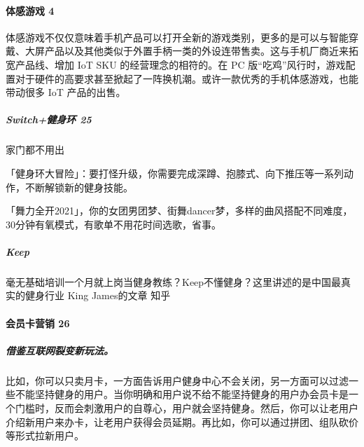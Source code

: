 \documentclass[letterpaper,11pt,english]{sphinxmanual}
\begin{document}
\paragraph{体感游戏 4\sphinxfootnotemark[706]}
\label{\detokenize{chapter_project/AI_fit:id14}}%
\begin{footnotetext}[706]\sphinxAtStartFootnote
{}
%
\end{footnotetext}\ignorespaces 
体感游戏不仅仅意味着手机产品可以打开全新的游戏类别，更多的是可以与智能穿戴、大屏产品以及其他类似于外置手柄一类的外设连带售卖。这与手机厂商近来拓宽产品线、增加
IoT SKU 的经营理念的相符的。在 PC
版“吃鸡”风行时，游戏配置对于硬件的高要求甚至掀起了一阵换机潮。或许一款优秀的手机体感游戏，也能带动很多
IoT 产品的出售。


\subparagraph{Switch+健身环 25\sphinxfootnotemark[707]}
\label{\detokenize{chapter_project/AI_fit:switch-25}}%
\begin{footnotetext}[707]\sphinxAtStartFootnote
{}
%
\end{footnotetext}\ignorespaces 
家门都不用出

「健身环大冒险」：要打怪升级，你需要完成深蹲、抱膝式、向下推压等一系列动作，不断解锁新的健身技能。

「舞力全开2021」，你的女团男团梦、街舞dancer梦，多样的曲风搭配不同难度，30分钟有氧模式，有歌单不用花时间选歌，省事。


\subparagraph{Keep}
\label{\detokenize{chapter_project/AI_fit:keep}}
毫无基础培训一个月就上岗当健身教练？Keep不懂健身？这里讲述的是中国最真实的健身行业
\sphinxhyphen{} King James的文章 \sphinxhyphen{} 知乎 


\paragraph{会员卡营销 26\sphinxfootnotemark[708]}
\label{\detokenize{chapter_project/AI_fit:id15}}%
\begin{footnotetext}[708]\sphinxAtStartFootnote
{}
%
\end{footnotetext}\ignorespaces 

\subparagraph{借鉴互联网裂变新玩法。}
\label{\detokenize{chapter_project/AI_fit:id16}}
比如，你可以只卖月卡，一方面告诉用户健身中心不会关闭，另一方面可以过滤一些不能坚持健身的用户。当你明确和用户说不给不能坚持健身的用户办会员卡是一个门槛时，反而会刺激用户的自尊心，用户就会坚持健身。然后，你可以让老用户介绍新用户来办卡，让老用户获得会员延期。再比如，你可以通过拼团、组队砍价等形式拉新用户。
\end{document}

